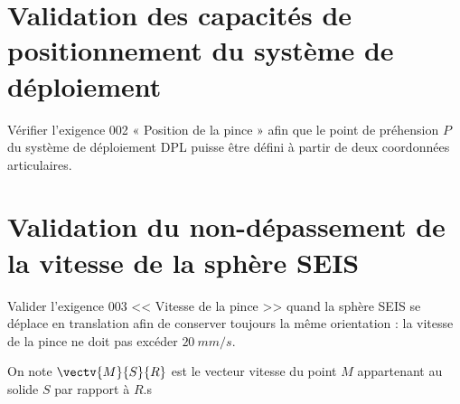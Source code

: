 \section{Validation des capacités de positionnement du système de déploiement}

\begin{obj}
Vérifier l’exigence 002 « Position de la pince » afin que le point de préhension $P$ du 
système de déploiement DPL puisse être défini à partir de deux coordonnées articulaires.
\end{obj}
%
%



\section{Validation du non-dépassement de la vitesse de la sphère SEIS}

\begin{obj}
Valider l’exigence 003 << Vitesse de la pince >> quand la sphère SEIS se déplace en 
translation afin de conserver toujours la même orientation : la vitesse de la pince ne doit pas excéder $\SI{20}{mm/s}$.
\end{obj}

On note $\vectv{M}{S}{R}$ est le vecteur vitesse du point $M$ appartenant au solide $S$ par rapport à $R$.s



